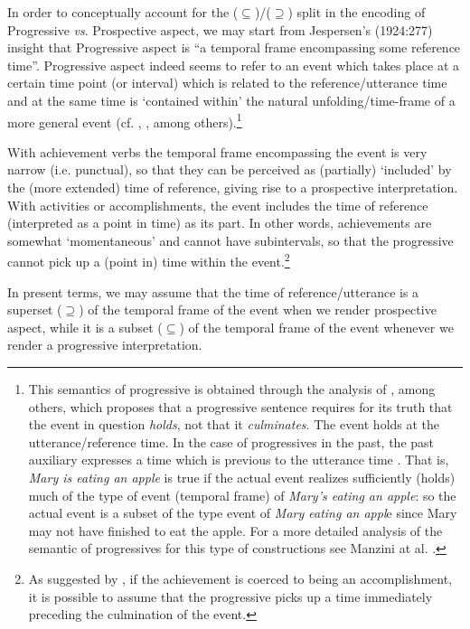 \documentclass[output=paper,colorlinks,citecolor=brown]{./langscibook}
\begin{document}
In order to conceptually account for the (${\subseteq}$)/(${\supseteq}$) split in the encoding of Progressive \textit{vs}. Prospective aspect, we may start from Jespersen’s (1924:277) insight that Progressive aspect is “a temporal frame encompassing some reference time”. Progressive aspect indeed seems to refer to an event which takes place at a certain time point (or interval) which is related to the reference/utterance time and at the same time is  ‘contained within’ the natural unfolding/time-frame of a more general event (cf. \citealt{Dowty1979}, \citealt{Higginbotham2004}, among others).\footnote{This semantics of progressive is obtained through the analysis of \citet{Higginbotham2009}, \citet{Parson1989} \citet{Landman1992} among others, which proposes that a progressive sentence requires for its truth that the event in question \textit{holds}, not that it \textit{culminates}. The event holds at the utterance/reference time. In the case of progressives in the past, the past auxiliary expresses a time which is previous to the utterance time \citep{Higginbotham2009}. That is, \textit{Mary is eating an apple} is true if the actual event realizes sufficiently (holds) much of the type of event (temporal frame) of \textit{Mary’s eating an apple}: so the actual event is a subset of the type event of \textit{Mary eating an appl}e since Mary may not have finished to eat the apple. For a more detailed analysis of the semantic of progressives for this type of constructions see Manzini at al. .} 

With achievement verbs the temporal frame encompassing the event is very narrow (i.e. punctual), so that they can be perceived as (partially) ‘included’ by the (more extended) time of reference, giving rise to a prospective interpretation. With activities or accomplishments, the event includes the time of reference (interpreted as a point in time) as its part. In other words, achievements are somewhat ‘momentaneous’ and cannot have subintervals, so that the progressive cannot pick up a (point in) time within the event.\footnote{As suggested by \citet{Rothstein2004}, if the achievement is coerced to being an accomplishment, it is possible to assume that the progressive picks up a time immediately preceding the culmination of the event.} 

In present terms, we may assume that the time of reference/utterance is a superset (${\supseteq}$) of the temporal frame of the event when we render prospective aspect, while it is a subset (${\subseteq}$) of the temporal frame of the event whenever we render a progressive interpretation.
\end{document}
